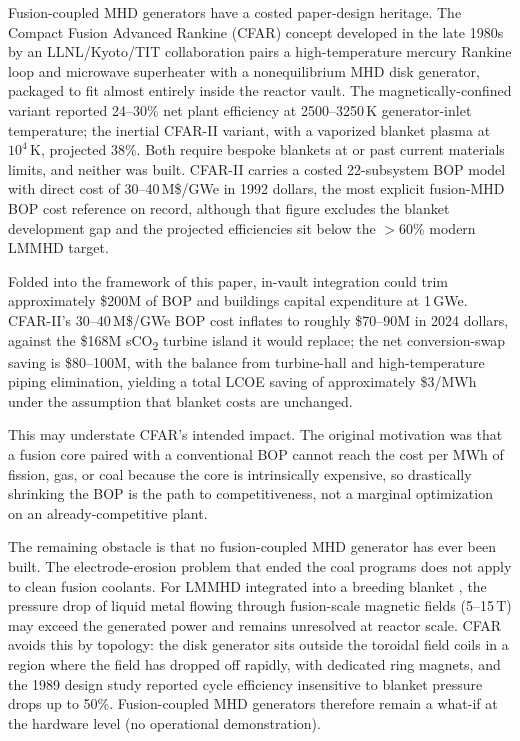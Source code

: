\documentclass{article}
\begin{document}
Fusion-coupled MHD generators have a costed paper-design heritage. The Compact Fusion
Advanced Rankine (CFAR) concept developed in the late 1980s by an
LLNL/Kyoto/TIT collaboration
\citep{HoffmanCampbellLogan1989,Logan1993} pairs a high-temperature
mercury Rankine loop and microwave superheater with a
nonequilibrium MHD disk generator, packaged to fit almost entirely
inside the reactor vault. The magnetically-confined variant reported
24--30\% net plant efficiency at 2500--3250\,K generator-inlet
temperature; the inertial CFAR-II variant, with a vaporized blanket
plasma at $10^4$\,K, projected 38\%. Both require bespoke blankets
at or past current materials limits, and neither was built. CFAR-II
carries a costed 22-subsystem BOP model with direct cost of
30--40\,M\$/GWe in 1992 dollars, the most explicit fusion-MHD BOP
cost reference on record, although that figure excludes the blanket
development gap and the projected efficiencies sit below the
$>$60\% modern LMMHD target.

Folded into the framework of this paper, in-vault integration could
trim approximately \$200M of BOP and buildings capital expenditure
at 1\,GWe. CFAR-II's 30--40\,M\$/GWe BOP cost inflates to roughly
\$70--90M in 2024 dollars, against the \$168M sCO\textsubscript{2}
turbine island it would replace; the net conversion-swap saving is
\$80--100M, with the balance from turbine-hall and high-temperature
piping elimination, yielding a total LCOE saving of approximately
\$3/MWh under the assumption that blanket costs are unchanged.

This may understate CFAR's intended impact. The original motivation
was that a fusion core paired with a conventional BOP cannot reach
the cost per MWh of fission, gas, or coal because the core is
intrinsically expensive, so drastically shrinking the BOP is the
path to competitiveness, not a marginal optimization on an
already-competitive plant.

The remaining obstacle is that no fusion-coupled MHD generator has
ever been built. The electrode-erosion problem that ended the coal programs
does not apply to clean fusion coolants. For LMMHD integrated into
a breeding blanket \citep{Smolentsev2022}, the pressure drop of
liquid metal flowing through fusion-scale magnetic fields
(5--15\,T) may exceed the generated power and remains unresolved at
reactor scale. CFAR avoids this by topology: the disk generator
sits outside the toroidal field coils in a region where the field
has dropped off rapidly, with dedicated ring magnets, and the 1989
design study \citep{HoffmanCampbellLogan1989} reported cycle
efficiency insensitive to blanket pressure drops up to 50\%.
Fusion-coupled MHD generators therefore remain a what-if at the
hardware level (no operational demonstration).
\end{document}
